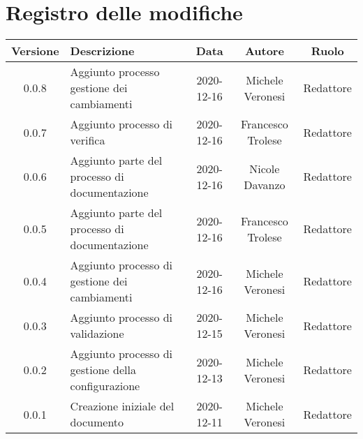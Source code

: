 \section*{Registro delle modifiche}

\begin{center}
	\begin{longtable}{|c|p{5cm}|c|c|c|}
	\hline
	\rowcolor{lighter-grayer}
	\textbf{Versione} & \textbf{Descrizione} & \textbf{Data} & \textbf{Autore} & \textbf{Ruolo} \\
	\hline
	\endfirsthead


	\hline
	0.0.8 & Aggiunto processo gestione dei cambiamenti & 2020-12-16 & Michele Veronesi & Redattore \\
	0.0.7 & Aggiunto processo di verifica & 2020-12-16 & Francesco Trolese & Redattore \\
	0.0.6 & Aggiunto parte del processo di documentazione & 2020-12-16 & Nicole Davanzo & Redattore \\
	0.0.5 & Aggiunto parte del processo di documentazione & 2020-12-16 & Francesco Trolese & Redattore \\
	0.0.4 & Aggiunto processo di gestione dei cambiamenti & 2020-12-16 & Michele Veronesi & Redattore \\
	0.0.3 & Aggiunto processo di validazione & 2020-12-15 & Michele Veronesi & Redattore \\
	0.0.2 & Aggiunto processo di gestione della configurazione & 2020-12-13 & Michele Veronesi & Redattore \\
	0.0.1 & Creazione iniziale del documento & 2020-12-11 & Michele Veronesi & Redattore \\
	\hline

	\end{longtable}
\end{center}